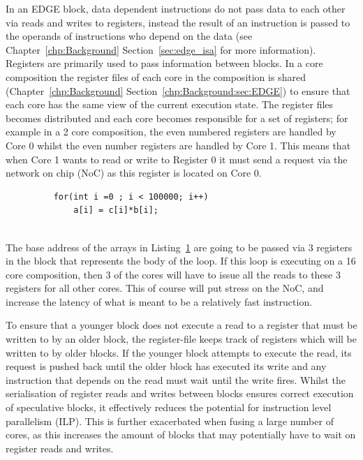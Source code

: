 In an EDGE block, data dependent instructions do not pass data to each other via reads and writes to registers, instead the result of an instruction is passed to the operands of instructions who depend on the data (see Chapter~\ref{chp:Background} Section~\ref{sec:edge_isa} for more information).
Registers are primarily used to pass information between blocks.
In a core composition the register files of each core in the composition is shared (Chapter~\ref{chp:Background} Section~\ref{chp:Background:sec:EDGE}) to ensure that each core has the same view of the current execution state.
The register files becomes distributed and each core becomes responsible for a set of registers; for example in a 2 core composition, the even numbered registers are handled by Core 0 whilst the even number registers are handled by Core 1.
This means that when Core 1 wants to read or write to Register 0 it must send a request via the network on chip (NoC) as this register is located on Core 0.

\begin{figure}[t]
\lstset{language=C,numbersep=4pt}
\begin{center}
\begin{lstlisting}
	for(int i =0 ; i < 100000; i++)
		a[i] = c[i]*b[i];
	
\end{lstlisting}
\end{center}
\vspace{-1em}
\label{lst:basic2}
\vspace{3em}
\end{figure}

The base address of the arrays in Listing~\ref{lst:basic2} are going to be passed via 3 registers in the block that represents the body of the loop.
If this loop is executing on a 16 core composition, then 3 of the cores will have to issue all the reads to these 3 registers for all other cores.
This of course will put stress on the NoC, and increase the latency of what is meant to be a relatively fast instruction.

To ensure that a younger block does not execute a read to a register that must be written to by an older block, the register-file keeps track of registers which will be written to by older blocks.
If the younger block attempts to execute the read, its request is pushed back until the older block has executed its write and any instruction that depends on the read must wait until the write fires.
Whilst the serialisation of register reads and writes between blocks ensures correct execution of speculative blocks, it effectively reduces the potential for instruction level parallelism (ILP).
This is further exacerbated when fusing a large number of cores, as this increases the amount of blocks that may potentially have to wait on register reads and writes.

